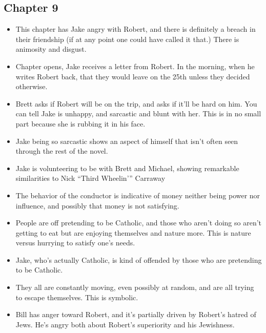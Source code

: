 \documentclass[11pt]{article}
\begin{document}
\subsection{Chapter 9}
\begin{itemize}
	\item This chapter has Jake angry with Robert, and there is definitely a 
		breach in their friendship (if at any point one could have called it
		that.)  There is animosity and disgust.
	\item Chapter opens, Jake receives a letter from Robert.  In the morning,
		when he writes Robert back, that they would leave on the 25th unless
		they decided otherwise.
	\item Brett asks if Robert will be on the trip, and asks if it'll be hard
		on him.  You can tell Jake is unhappy, and sarcastic and blunt with her.
		This is in no small part because she is rubbing it in his face.
	\item Jake being so sarcastic shows an aspect of himself that isn't often
		seen through the rest of the novel.
	\item Jake is volunteering to be with Brett and Michael, showing remarkable
		similarities to Nick ``Third Wheelin{'}'' Carraway
	\item The behavior of the conductor is indicative of money neither being
		power nor influence, and possibly that money is not satisfying.  
	\item People are off pretending to be Catholic, and those who aren't 
		doing so aren't getting to eat but are enjoying themselves and nature
		more.  This is nature versus hurrying to satisfy one's needs.
	\item Jake, who's actually Catholic, is kind of offended by those who are
		pretending to be Catholic.
	\item They all are constantly moving, even possibly at random, and are all
		trying to escape themselves.  This is symbolic.
	\item Bill has anger toward Robert, and it's partially driven by Robert's
		hatred of Jews.  He's angry both about Robert's superiority and his
		Jewishness.
	\end{itemize}
\section{}
\end{document}
